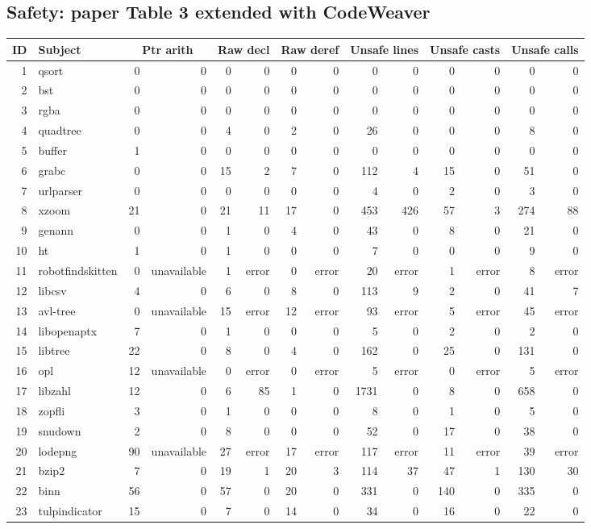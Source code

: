 \documentclass{article}
\begin{document}
\subsection*{Safety: paper Table 3 extended with CodeWeaver}
\begin{landscape}
\begin{longtable}{r l r r r r r r r r r r r r }
ID & Subject & \multicolumn{2}{c}{Ptr arith} & \multicolumn{2}{c}{Raw decl} & \multicolumn{2}{c}{Raw deref} & \multicolumn{2}{c}{Unsafe lines} & \multicolumn{2}{c}{Unsafe casts} & \multicolumn{2}{c}{Unsafe calls}\\\hline
1 & qsort & 0 & 0 & 0 & 0 & 0 & 0 & 0 & 0 & 0 & 0 & 0 & 0\\
2 & bst & 0 & 0 & 0 & 0 & 0 & 0 & 0 & 0 & 0 & 0 & 0 & 0\\
3 & rgba & 0 & 0 & 0 & 0 & 0 & 0 & 0 & 0 & 0 & 0 & 0 & 0\\
4 & quadtree & 0 & 0 & 4 & 0 & 2 & 0 & 26 & 0 & 0 & 0 & 8 & 0\\
5 & buffer & 1 & 0 & 0 & 0 & 0 & 0 & 0 & 0 & 0 & 0 & 0 & 0\\
6 & grabc & 0 & 0 & 15 & 2 & 7 & 0 & 112 & 4 & 15 & 0 & 51 & 0\\
7 & urlparser & 0 & 0 & 0 & 0 & 0 & 0 & 4 & 0 & 2 & 0 & 3 & 0\\
8 & xzoom & 21 & 0 & 21 & 11 & 17 & 0 & 453 & 426 & 57 & 3 & 274 & 88\\
9 & genann & 0 & 0 & 1 & 0 & 4 & 0 & 43 & 0 & 8 & 0 & 21 & 0\\
10 & ht & 1 & 0 & 1 & 0 & 0 & 0 & 7 & 0 & 0 & 0 & 9 & 0\\
11 & robotfindskitten & 0 & unavailable & 1 & error & 0 & error & 20 & error & 1 & error & 8 & error\\
12 & libcsv & 4 & 0 & 6 & 0 & 8 & 0 & 113 & 9 & 2 & 0 & 41 & 7\\
13 & avl-tree & 0 & unavailable & 15 & error & 12 & error & 93 & error & 5 & error & 45 & error\\
14 & libopenaptx & 7 & 0 & 1 & 0 & 0 & 0 & 5 & 0 & 2 & 0 & 2 & 0\\
15 & libtree & 22 & 0 & 8 & 0 & 4 & 0 & 162 & 0 & 25 & 0 & 131 & 0\\
16 & opl & 12 & unavailable & 0 & error & 0 & error & 5 & error & 0 & error & 5 & error\\
17 & libzahl & 12 & 0 & 6 & 85 & 1 & 0 & 1731 & 0 & 8 & 0 & 658 & 0\\
18 & zopfli & 3 & 0 & 1 & 0 & 0 & 0 & 8 & 0 & 1 & 0 & 5 & 0\\
19 & snudown & 2 & 0 & 8 & 0 & 0 & 0 & 52 & 0 & 17 & 0 & 38 & 0\\
20 & lodepng & 90 & unavailable & 27 & error & 17 & error & 117 & error & 11 & error & 39 & error\\
21 & bzip2 & 7 & 0 & 19 & 1 & 20 & 3 & 114 & 37 & 47 & 1 & 130 & 30\\
22 & binn & 56 & 0 & 57 & 0 & 20 & 0 & 331 & 0 & 140 & 0 & 335 & 0\\
23 & tulpindicator & 15 & 0 & 7 & 0 & 14 & 0 & 34 & 0 & 16 & 0 & 22 & 0\\
\end{longtable}
\end{landscape}
\end{document}

